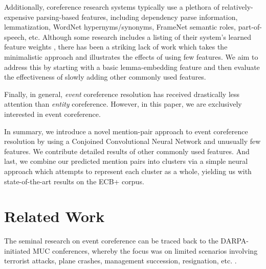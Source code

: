 \documentclass[11pt,a4paper]{article}
\begin{document}
Additionally, coreference research systems typically use a plethora of relatively-expensive parsing-based features, including dependency parse information, lemmatization, WordNet hypernyms/synonyms, FrameNet semantic roles, part-of-speech, etc.  Although some research includes a listing of their system's learned feature weights \cite{journals/tacl/YangCF15}, there has been a striking lack of work which takes the minimalistic approach and illustrates the effects of using few features.  We aim to address this by starting with a basic lemma-embedding feature and then evaluate the effectiveness of slowly adding other commonly used features.

Finally, in general, \textit{event} coreference resolution has received drastically less attention than \textit{entity} coreference.  However, in this paper, we are exclusively interested in event coreference.

In summary, we introduce a novel mention-pair approach to event coreference resolution by using a Conjoined Convolutional Neural Network and unusually few features.  We contribute detailed results of other commonly used features.  And last, we combine our predicted mention pairs into clusters via a simple neural approach which attempts to represent each cluster as a whole, yielding us with state-of-the-art results on the ECB+ corpus.



\section{Related Work}
The seminal research on event coreference can be traced back to the DARPA-initiated MUC conferences, whereby the focus was on limited scenarios involving terrorist attacks, plane crashes, management succession, resignation, etc. \cite{Humphreys:1997,Bagga:1999:CEC:1608810.1608812}.


\end{document}
